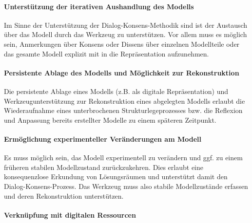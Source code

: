 
\paragraph{Unterstützung der iterativen Aushandlung des Modells} %
\label{par:unterstützung_der_iterativen_aushandlung_des_modells}

Im Sinne der Unterstützung der Dialog-Konsens-Methodik sind ist der Austausch über das Modell durch das Werkzeug zu unterstützen. Vor allem muss es möglich sein, Anmerkungen über Konsens oder Dissens über einzelnen Modellteile oder das gesamte Modell explizit mit in die Repräsentation aufzunehmen. 


\paragraph{Persistente Ablage des Modells und Möglichkeit zur Rekonstruktion} %
\label{par:persistente_ablage_des_modells_möglichkeit_zur_rekonstruktion}

Die persistente Ablage eines Modells (z.B. als digitale Repräsentation) und Werkzeugunterstützung zur Rekonstruktion eines abgelegten Modells erlaubt die Wiederaufnahme eines unterbrochenen Strukturlegeprozesses bzw. die Reflexion und Anpassung bereits erstellter Modelle zu einem späteren Zeitpunkt.


\paragraph{Ermöglichung experimenteller Veränderungen am Modell} %
\label{par:ermöglichung_experimenteller_veränderungen_am_modell}

Es muss möglich sein, das Modell experimentell zu verändern und ggf. zu einem früheren stabilen Modellzustand zurückzukehren. Dies erlaubt eine konsequenzlose Erkundung von Lösungsräumen und unterstützt damit den Dialog-Konsens-Prozess. Das Werkzeug muss also stabile Modellzustände erfassen und deren Rekonstruktion unterstützen.

\paragraph{Verknüpfung mit digitalen Ressourcen} %
\label{par:verknüpfung_mit_digitalen_ressourcen}

